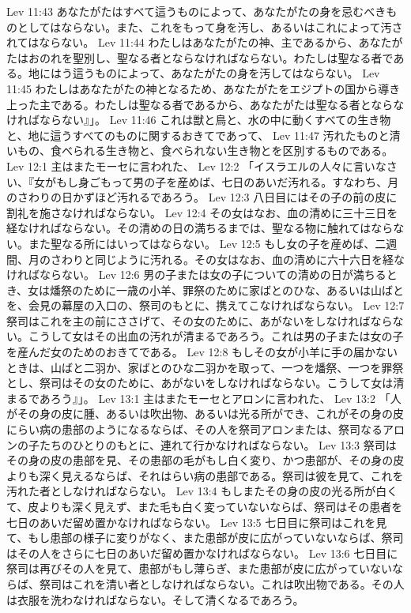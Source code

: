 Lev 11:43  あなたがたはすべて這うものによって、あなたがたの身を忌むべきものとしてはならない。また、これをもって身を汚し、あるいはこれによって汚されてはならない。
Lev 11:44  わたしはあなたがたの神、主であるから、あなたがたはおのれを聖別し、聖なる者とならなければならない。わたしは聖なる者である。地にはう這うものによって、あなたがたの身を汚してはならない。
Lev 11:45  わたしはあなたがたの神となるため、あなたがたをエジプトの国から導き上った主である。わたしは聖なる者であるから、あなたがたは聖なる者とならなければならない』」。
Lev 11:46  これは獣と鳥と、水の中に動くすべての生き物と、地に這うすべてのものに関するおきてであって、
Lev 11:47  汚れたものと清いもの、食べられる生き物と、食べられない生き物とを区別するものである。
Lev 12:1  主はまたモーセに言われた、
Lev 12:2  「イスラエルの人々に言いなさい、『女がもし身ごもって男の子を産めば、七日のあいだ汚れる。すなわち、月のさわりの日かずほど汚れるであろう。
Lev 12:3  八日目にはその子の前の皮に割礼を施さなければならない。
Lev 12:4  その女はなお、血の清めに三十三日を経なければならない。その清めの日の満ちるまでは、聖なる物に触れてはならない。また聖なる所にはいってはならない。
Lev 12:5  もし女の子を産めば、二週間、月のさわりと同じように汚れる。その女はなお、血の清めに六十六日を経なければならない。
Lev 12:6  男の子または女の子についての清めの日が満ちるとき、女は燔祭のために一歳の小羊、罪祭のために家ばとのひな、あるいは山ばとを、会見の幕屋の入口の、祭司のもとに、携えてこなければならない。
Lev 12:7  祭司はこれを主の前にささげて、その女のために、あがないをしなければならない。こうして女はその出血の汚れが清まるであろう。これは男の子または女の子を産んだ女のためのおきてである。
Lev 12:8  もしその女が小羊に手の届かないときは、山ばと二羽か、家ばとのひな二羽かを取って、一つを燔祭、一つを罪祭とし、祭司はその女のために、あがないをしなければならない。こうして女は清まるであろう』」。
Lev 13:1  主はまたモーセとアロンに言われた、
Lev 13:2  「人がその身の皮に腫、あるいは吹出物、あるいは光る所ができ、これがその身の皮にらい病の患部のようになるならば、その人を祭司アロンまたは、祭司なるアロンの子たちのひとりのもとに、連れて行かなければならない。
Lev 13:3  祭司はその身の皮の患部を見、その患部の毛がもし白く変り、かつ患部が、その身の皮よりも深く見えるならば、それはらい病の患部である。祭司は彼を見て、これを汚れた者としなければならない。
Lev 13:4  もしまたその身の皮の光る所が白くて、皮よりも深く見えず、また毛も白く変っていないならば、祭司はその患者を七日のあいだ留め置かなければならない。
Lev 13:5  七日目に祭司はこれを見て、もし患部の様子に変りがなく、また患部が皮に広がっていないならば、祭司はその人をさらに七日のあいだ留め置かなければならない。
Lev 13:6  七日目に祭司は再びその人を見て、患部がもし薄らぎ、また患部が皮に広がっていないならば、祭司はこれを清い者としなければならない。これは吹出物である。その人は衣服を洗わなければならない。そして清くなるであろう。
